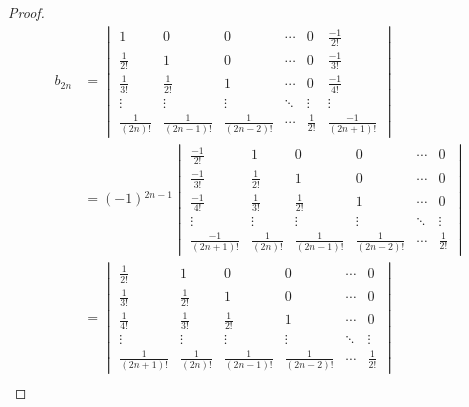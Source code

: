 \documentclass[class=nhvh-linear-algebra,crop=false]{standalone}
\begin{document}
\begin{proof}
	\begingroup{}
	\allowdisplaybreaks{}
	\begin{align*}
		b_{2n} & =
		\begin{vmatrix}
			1               & 0                 & 0                 & \cdots & 0            & \frac{-1}{2!}      \\
			\frac{1}{2!}    & 1                 & 0                 & \cdots & 0            & \frac{-1}{3!}      \\
			\frac{1}{3!}    & \frac{1}{2!}      & 1                 & \cdots & 0            & \frac{-1}{4!}      \\
			\vdots          & \vdots            & \vdots            & \ddots & \vdots       & \vdots             \\
			\frac{1}{(2n)!} & \frac{1}{(2n-1)!} & \frac{1}{(2n-2)!} & \cdots & \frac{1}{2!} & \frac{-1}{(2n+1)!}
		\end{vmatrix} \\
		       & = (-1){}^{2n-1}
		\begin{vmatrix}
			\frac{-1}{2!}      & 1               & 0                 & 0                 & \cdots & 0            \\
			\frac{-1}{3!}      & \frac{1}{2!}    & 1                 & 0                 & \cdots & 0            \\
			\frac{-1}{4!}      & \frac{1}{3!}    & \frac{1}{2!}      & 1                 & \cdots & 0            \\
			\vdots             & \vdots          & \vdots            & \vdots            & \ddots & \vdots       \\
			\frac{-1}{(2n+1)!} & \frac{1}{(2n)!} & \frac{1}{(2n-1)!} & \frac{1}{(2n-2)!} & \cdots & \frac{1}{2!}
		\end{vmatrix} \\
		       & =
		\begin{vmatrix}
			\frac{1}{2!}      & 1               & 0                 & 0                 & \cdots & 0            \\
			\frac{1}{3!}      & \frac{1}{2!}    & 1                 & 0                 & \cdots & 0            \\
			\frac{1}{4!}      & \frac{1}{3!}    & \frac{1}{2!}      & 1                 & \cdots & 0            \\
			\vdots            & \vdots          & \vdots            & \vdots            & \ddots & \vdots       \\
			\frac{1}{(2n+1)!} & \frac{1}{(2n)!} & \frac{1}{(2n-1)!} & \frac{1}{(2n-2)!} & \cdots & \frac{1}{2!}
		\end{vmatrix}  \\

\end{align*}
\end{proof}
\end{document}
